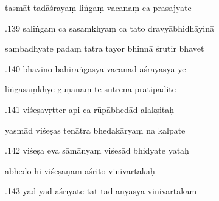 \documentclass[article,12pt,a4paper]{memoir}%
\newcounter{parCount}
\begin{document}
	  
	  \pstart \leavevmode%
	tasmāt tadāśrayaṃ liṅgaṃ vacanaṃ ca prasajyate 
	{}
	\pend%
      

	  
	  \pstart {}.139 saliṅgaṃ ca sasaṃkhyaṃ ca tato dravyābhidhāyinā 
	{}
	\pend%
      

	  
	  \pstart \leavevmode%
	saṃbadhyate padaṃ tatra tayor bhinnā śrutir bhavet 
	{}
	\pend%
      

	  
	  \pstart {}.140 bhāvino bahiraṅgasya vacanād āśrayasya ye 
	{}
	\pend%
      

	  
	  \pstart \leavevmode%
	liṅgasaṃkhye guṇānāṃ te sūtreṇa pratipādite 
	{}
	\pend%
      

	  
	  \pstart {}.141 viśeṣavṛtter api ca rūpābhedād alakṣitaḥ 
	{}
	\pend%
      

	  
	  \pstart \leavevmode%
	yasmād viśeṣas tenātra bhedakāryaṃ na kalpate 
	{}
	\pend%
      

	  
	  \pstart {}.142 viśeṣa eva sāmānyaṃ viśesād bhidyate yataḥ 
	{}
	\pend%
      

	  
	  \pstart \leavevmode%
	abhedo hi viśeṣāṇām āśrito vinivartakaḥ 
	{}
	\pend%
      

	  
	  \pstart {}.143 yad yad āśrīyate tat tad anyasya vinivartakam 
	{}
	\pend%
      
\end{document}
